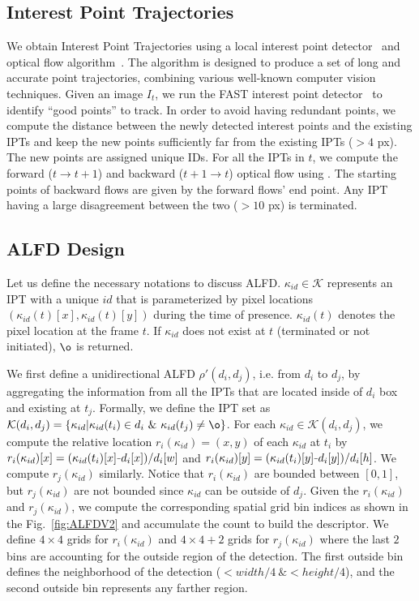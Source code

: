 \documentclass[10pt,twocolumn,letterpaper]{article}
\newcommand{\minus}{\scalebox{0.5}[1.0]{$-$}}
\begin{document}
\subsection{Interest Point Trajectories}

We obtain Interest Point Trajectories using a local interest point detector~\cite{bradski2008learning,rosten2006machine} and optical flow algorithm~\cite{bradski2008learning,farneback2001very}. The algorithm is designed to produce a set of long and accurate point trajectories, combining various well-known computer vision techniques. Given an image $I_t$, we run the FAST interest point detector~\cite{bradski2008learning,rosten2006machine} to identify ``good points'' to track. In order to avoid having redundant points, we compute the distance between the newly detected interest points and the existing IPTs and keep the new points sufficiently far from the existing IPTs ($ > 4$ px). The new points are assigned unique IDs. For all the IPTs in $t$, we compute the forward ($t \rightarrow t+1$) and backward ($t+1 \rightarrow t$) optical flow using \cite{bradski2008learning,farneback2001very}. The starting points of backward flows are given by the forward flows' end point. Any IPT having a  large disagreement between the two ($> 10$ px) is terminated. 

\subsection{ALFD Design}

Let us define the necessary notations to discuss ALFD. $\kappa_{id} \in \mathcal{K}$ represents an IPT with a unique $id$ that is parameterized by pixel locations $(\kappa_{id}(t)[x], \kappa_{id}(t)[y])$ during the time of presence. $\kappa_{id}(t)$ denotes the pixel location at the frame $t$. If $\kappa_{id}$ does not exist at $t$ (terminated or not initiated), $\o$ is returned.

We first define a unidirectional ALFD $\rho'(d_i, d_j)$, i.e. from $d_i$ to $d_j$, by aggregating the information from all the IPTs that are located inside of $d_i$ box and existing at $t_j$. Formally, we define the IPT set as $\mathcal{K}(d_i, d_j) = \{\kappa_{id} | \kappa_{id}(t_i) \in d_i\ \&\ \kappa_{id}(t_j) \neq \o \}$. For each $\kappa_{id} \in \mathcal{K}(d_i, d_j)$, we compute the relative location $r_i(\kappa_{id}) = (x, y)$ of each $\kappa_{id}$ at $t_i$ by $r_i(\kappa_{id})[x] = ( \kappa_{id}(t_i)[x] \minus d_i[x] ) / d_i[w]$ and $r_i(\kappa_{id})[y] = ( \kappa_{id}(t_i)[y] \minus d_i[y] ) / d_i[h]$. We compute $r_j(\kappa_{id})$ similarly. Notice that $r_i(\kappa_{id})$ are bounded between $[0, 1]$, but $r_j(\kappa_{id})$ are not bounded since $\kappa_{id}$ can be outside of $d_j$. Given the $r_i(\kappa_{id})$ and $r_j(\kappa_{id})$, we compute the corresponding spatial grid bin indices as shown in the Fig.~\ref{fig:ALFDV2} and accumulate the count to build the descriptor. We define $4 \times 4$ grids for $r_i(\kappa_{id})$ and $4 \times 4 + 2$ grids for $r_j(\kappa_{id})$ where the last $2$ bins are accounting for the outside region of the detection. The first outside bin defines the neighborhood of the detection ($ < width/4\ \& < height/4$), and the second outside bin represents any farther region. 
\end{document}
